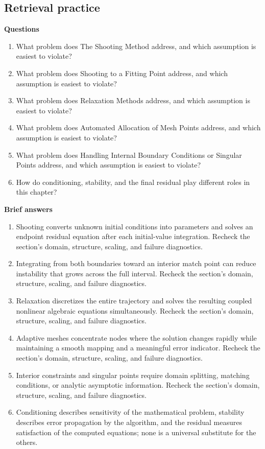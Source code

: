 \documentclass[10pt,letterpaper]{article}
\begin{document}
\subsection*{Retrieval practice}
\textbf{Questions}
\begin{enumerate}
\item What problem does The Shooting Method address, and which assumption is easiest to violate?
\item What problem does Shooting to a Fitting Point address, and which assumption is easiest to violate?
\item What problem does Relaxation Methods address, and which assumption is easiest to violate?
\item What problem does Automated Allocation of Mesh Points address, and which assumption is easiest to violate?
\item What problem does Handling Internal Boundary Conditions or Singular Points address, and which assumption is easiest to violate?
\item How do conditioning, stability, and the final residual play different roles in this chapter?
\end{enumerate}

\textbf{Brief answers}
\begin{enumerate}
\item Shooting converts unknown initial conditions into parameters and solves an endpoint residual equation after each initial-value integration. Recheck the section's domain, structure, scaling, and failure diagnostics.
\item Integrating from both boundaries toward an interior match point can reduce instability that grows across the full interval. Recheck the section's domain, structure, scaling, and failure diagnostics.
\item Relaxation discretizes the entire trajectory and solves the resulting coupled nonlinear algebraic equations simultaneously. Recheck the section's domain, structure, scaling, and failure diagnostics.
\item Adaptive meshes concentrate nodes where the solution changes rapidly while maintaining a smooth mapping and a meaningful error indicator. Recheck the section's domain, structure, scaling, and failure diagnostics.
\item Interior constraints and singular points require domain splitting, matching conditions, or analytic asymptotic information. Recheck the section's domain, structure, scaling, and failure diagnostics.
\item Conditioning describes sensitivity of the mathematical problem, stability describes error propagation by the algorithm, and the residual measures satisfaction of the computed equations; none is a universal substitute for the others.
\end{enumerate}
\end{document}
